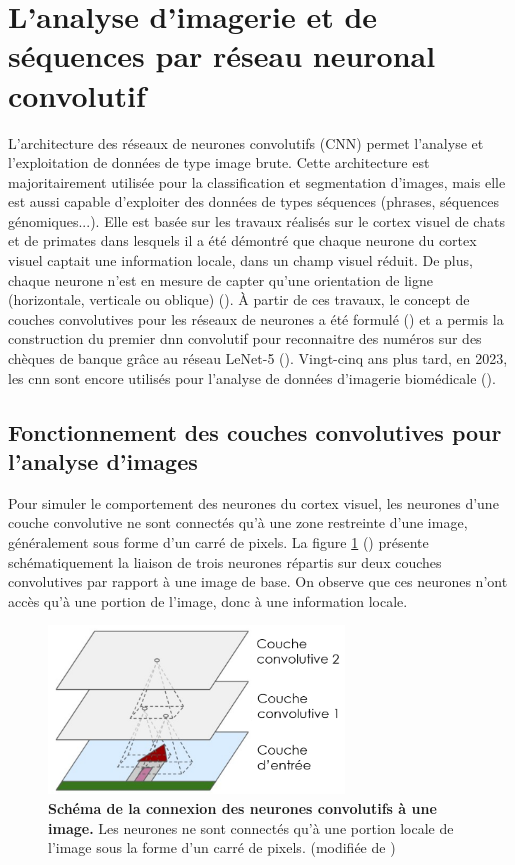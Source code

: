 \section{L'analyse d'imagerie et de séquences par réseau neuronal convolutif}
L'architecture des réseaux de neurones convolutifs (CNN) permet l'analyse et l'exploitation de données de type image brute. Cette architecture est majoritairement utilisée pour la classification et segmentation d'images, mais elle est aussi capable d'exploiter des données de types séquences (phrases, séquences génomiques...). Elle est basée sur les travaux réalisés sur le cortex visuel de chats et de primates dans lesquels il a été démontré que chaque neurone du cortex visuel captait une information locale, dans un champ visuel réduit. De plus, chaque neurone n'est en mesure de capter qu'une orientation de ligne (horizontale, verticale ou oblique) (\cite{hubel_receptive_1959, hubel_single_1959}). À partir de ces travaux, le concept de couches convolutives pour les réseaux de neurones a été formulé (\cite{fukushima_neocognitron_1980}) et a permis la construction du premier \gls{dnn} convolutif pour reconnaitre des numéros sur des chèques de banque grâce au réseau LeNet-5 (\cite{lecun_gradient-based_1998}). Vingt-cinq ans plus tard, en 2023, les \gls{cnn} sont encore utilisés pour l'analyse de données d'imagerie biomédicale (\cite{holscher_next-generation_2023, ker_automated_2019}).
 
\subsection{Fonctionnement des couches convolutives pour l'analyse d'images}
Pour simuler le comportement des neurones du cortex visuel, les neurones d'une couche convolutive ne sont connectés qu'à une zone restreinte d'une image, généralement sous forme d'un carré de pixels. La figure \ref{fig:conv_simple} (\cite{aurelien_geron_hands-machine_2019}) présente schématiquement la liaison de trois neurones répartis sur deux couches convolutives par rapport à une image de base. On observe que ces neurones n'ont accès qu'à une portion de l'image, donc à une information locale. 
\begin{figure}[!ht]
 \centering
 \includegraphics[width=0.7\textwidth]{figures/conv_simple.png}
 \caption[Schéma de la connection des neurones convolutifs à une image]{\textbf{Schéma de la connexion des neurones convolutifs à une image.} Les neurones ne sont connectés qu'à une portion locale de l'image sous la forme d'un carré de pixels. (modifiée de \cite{aurelien_geron_hands-machine_2019})}
 \label{fig:conv_simple}
\end{figure}


